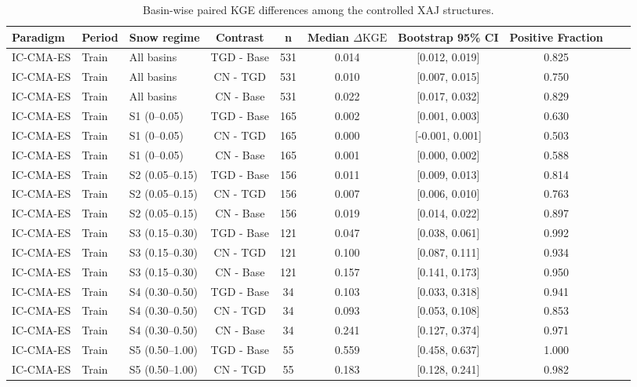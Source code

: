\begin{table}[t]
\centering
\caption{Basin-wise paired KGE differences among the controlled XAJ structures.}
\label{tab:s2_paired_structural_kge_differences}
\begin{threeparttable}
\begin{tabular}{lllccccccc}
\toprule
Paradigm & Period & Snow regime & Contrast & n & Median $\Delta\text{KGE}$ & Bootstrap 95\% CI & Positive Fraction \\
\midrule
IC-CMA-ES & Train & All basins & TGD - Base & 531 & 0.014 & [0.012, 0.019] & 0.825 \\
IC-CMA-ES & Train & All basins & CN - TGD & 531 & 0.010 & [0.007, 0.015] & 0.750 \\
IC-CMA-ES & Train & All basins & CN - Base & 531 & 0.022 & [0.017, 0.032] & 0.829 \\
IC-CMA-ES & Train & S1 (0–0.05) & TGD - Base & 165 & 0.002 & [0.001, 0.003] & 0.630 \\
IC-CMA-ES & Train & S1 (0–0.05) & CN - TGD & 165 & 0.000 & [-0.001, 0.001] & 0.503 \\
IC-CMA-ES & Train & S1 (0–0.05) & CN - Base & 165 & 0.001 & [0.000, 0.002] & 0.588 \\
IC-CMA-ES & Train & S2 (0.05–0.15) & TGD - Base & 156 & 0.011 & [0.009, 0.013] & 0.814 \\
IC-CMA-ES & Train & S2 (0.05–0.15) & CN - TGD & 156 & 0.007 & [0.006, 0.010] & 0.763 \\
IC-CMA-ES & Train & S2 (0.05–0.15) & CN - Base & 156 & 0.019 & [0.014, 0.022] & 0.897 \\
IC-CMA-ES & Train & S3 (0.15–0.30) & TGD - Base & 121 & 0.047 & [0.038, 0.061] & 0.992 \\
IC-CMA-ES & Train & S3 (0.15–0.30) & CN - TGD & 121 & 0.100 & [0.087, 0.111] & 0.934 \\
IC-CMA-ES & Train & S3 (0.15–0.30) & CN - Base & 121 & 0.157 & [0.141, 0.173] & 0.950 \\
IC-CMA-ES & Train & S4 (0.30–0.50) & TGD - Base & 34 & 0.103 & [0.033, 0.318] & 0.941 \\
IC-CMA-ES & Train & S4 (0.30–0.50) & CN - TGD & 34 & 0.093 & [0.053, 0.108] & 0.853 \\
IC-CMA-ES & Train & S4 (0.30–0.50) & CN - Base & 34 & 0.241 & [0.127, 0.374] & 0.971 \\
IC-CMA-ES & Train & S5 (0.50–1.00) & TGD - Base & 55 & 0.559 & [0.458, 0.637] & 1.000 \\
IC-CMA-ES & Train & S5 (0.50–1.00) & CN - TGD & 55 & 0.183 & [0.128, 0.241] & 0.982 \\

\end{tabular}
\end{threeparttable}
\end{table}
